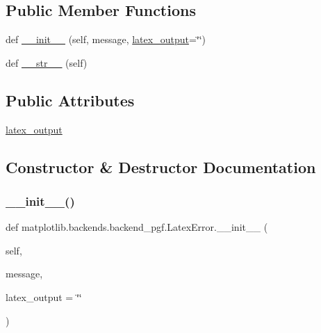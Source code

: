 \subsection*{Public Member Functions}
\begin{DoxyCompactItemize}
\item 
def \hyperlink{classmatplotlib_1_1backends_1_1backend__pgf_1_1LatexError_a8182212bbe62c52807b7f2e8c756c1ec}{\+\_\+\+\_\+init\+\_\+\+\_\+} (self, message, \hyperlink{classmatplotlib_1_1backends_1_1backend__pgf_1_1LatexError_aee5844cba69f119809f3f04b8e8eb3a0}{latex\+\_\+output}=\char`\"{}\char`\"{})
\item 
def \hyperlink{classmatplotlib_1_1backends_1_1backend__pgf_1_1LatexError_a0da98bcddcb0393a51376fba9d04f194}{\+\_\+\+\_\+str\+\_\+\+\_\+} (self)
\end{DoxyCompactItemize}
\subsection*{Public Attributes}
\begin{DoxyCompactItemize}
\item 
\hyperlink{classmatplotlib_1_1backends_1_1backend__pgf_1_1LatexError_aee5844cba69f119809f3f04b8e8eb3a0}{latex\+\_\+output}
\end{DoxyCompactItemize}


\subsection{Constructor \& Destructor Documentation}
\mbox{\label{classmatplotlib_1_1backends_1_1backend__pgf_1_1LatexError_a8182212bbe62c52807b7f2e8c756c1ec}} 
\subsubsection{\texorpdfstring{\+\_\+\+\_\+init\+\_\+\+\_\+()}{\_\_init\_\_()}}
{\footnotesize\ttfamily def matplotlib.\+backends.\+backend\+\_\+pgf.\+Latex\+Error.\+\_\+\+\_\+init\+\_\+\+\_\+ (\begin{DoxyParamCaption}\item[{}]{self,  }\item[{}]{message,  }\item[{}]{latex\+\_\+output = {\ttfamily \char`\"{}\char`\"{}} }\end{DoxyParamCaption})}



